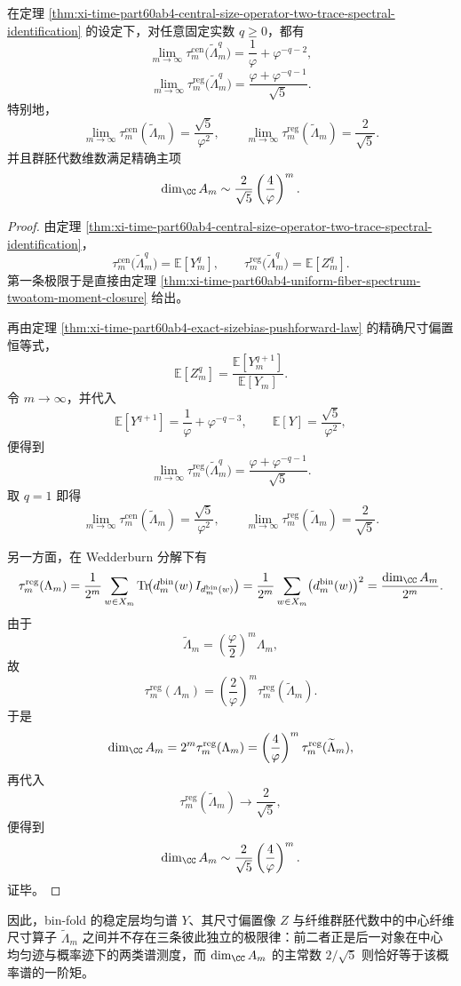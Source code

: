 \begin{theorem}[中心纤维尺寸算子的全阶矩与群胚代数维数主常数]\label{thm:xi-time-part60ab4-central-size-schatten-moment-dimension-constant}
在定理 \ref{thm:xi-time-part60ab4-central-size-operator-two-trace-spectral-identification} 的设定下，对任意固定实数 \(q\ge 0\)，都有
\[
\lim_{m\to\infty}
\tau_m^{\mathrm{cen}}\!\bigl(\widetilde\Lambda_m^q\bigr)
=
\frac{1}{\varphi}+\varphi^{-q-2},
\]
\[
\lim_{m\to\infty}
\tau_m^{\mathrm{reg}}\!\bigl(\widetilde\Lambda_m^q\bigr)
=
\frac{\varphi+\varphi^{-q-1}}{\sqrt5}.
\]
特别地，
\[
\lim_{m\to\infty}\tau_m^{\mathrm{cen}}(\widetilde\Lambda_m)
=
\frac{\sqrt5}{\varphi^2},
\qquad
\lim_{m\to\infty}\tau_m^{\mathrm{reg}}(\widetilde\Lambda_m)
=
\frac{2}{\sqrt5}.
\]
并且群胚代数维数满足精确主项
\[
\dim_{\CC}A_m
\sim
\frac{2}{\sqrt5}
\left(\frac{4}{\varphi}\right)^m.
\]
\end{theorem}
\begin{proof}
由定理 \ref{thm:xi-time-part60ab4-central-size-operator-two-trace-spectral-identification}，
\[
\tau_m^{\mathrm{cen}}\!\bigl(\widetilde\Lambda_m^q\bigr)
=
\mathbb E[Y_m^q],
\qquad
\tau_m^{\mathrm{reg}}\!\bigl(\widetilde\Lambda_m^q\bigr)
=
\mathbb E[Z_m^q].
\]
第一条极限于是直接由定理 \ref{thm:xi-time-part60ab4-uniform-fiber-spectrum-twoatom-moment-closure} 给出。

再由定理 \ref{thm:xi-time-part60ab4-exact-sizebias-pushforward-law} 的精确尺寸偏置恒等式，
\[
\mathbb E[Z_m^q]
=
\frac{\mathbb E[Y_m^{q+1}]}{\mathbb E[Y_m]}.
\]
令 \(m\to\infty\)，并代入
\[
\mathbb E[Y^{q+1}]
=
\frac{1}{\varphi}+\varphi^{-q-3},
\qquad
\mathbb E[Y]
=
\frac{\sqrt5}{\varphi^2},
\]
便得到
\[
\lim_{m\to\infty}\tau_m^{\mathrm{reg}}\!\bigl(\widetilde\Lambda_m^q\bigr)
=
\frac{\varphi+\varphi^{-q-1}}{\sqrt5}.
\]
取 \(q=1\) 即得
\[
\lim_{m\to\infty}\tau_m^{\mathrm{cen}}(\widetilde\Lambda_m)
=
\frac{\sqrt5}{\varphi^2},
\qquad
\lim_{m\to\infty}\tau_m^{\mathrm{reg}}(\widetilde\Lambda_m)
=
\frac{2}{\sqrt5}.
\]

另一方面，在 Wedderburn 分解下有
\[
\tau_m^{\mathrm{reg}}(\Lambda_m)
=
\frac{1}{2^m}
\sum_{w\in X_m}
\operatorname{Tr}\!\bigl(
d_m^{\mathrm{bin}}(w)\,I_{d_m^{\mathrm{bin}}(w)}
\bigr)
=
\frac{1}{2^m}
\sum_{w\in X_m}\bigl(d_m^{\mathrm{bin}}(w)\bigr)^2
=
\frac{\dim_{\CC}A_m}{2^m}.
\]
由于
\[
\widetilde\Lambda_m
=
\left(\frac{\varphi}{2}\right)^m\Lambda_m,
\]
故
\[
\tau_m^{\mathrm{reg}}(\Lambda_m)
=
\left(\frac{2}{\varphi}\right)^m
\tau_m^{\mathrm{reg}}(\widetilde\Lambda_m).
\]
于是
\[
\dim_{\CC}A_m
=
2^m\tau_m^{\mathrm{reg}}(\Lambda_m)
=
\left(\frac{4}{\varphi}\right)^m
\tau_m^{\mathrm{reg}}(\widetilde\Lambda_m),
\]
再代入
\[
\tau_m^{\mathrm{reg}}(\widetilde\Lambda_m)\longrightarrow \frac{2}{\sqrt5},
\]
便得到
\[
\dim_{\CC}A_m
\sim
\frac{2}{\sqrt5}
\left(\frac{4}{\varphi}\right)^m.
\]
证毕。
\end{proof}

因此，bin-fold 的稳定层均匀谱 \(Y\)、其尺寸偏置像 \(Z\) 与纤维群胚代数中的中心纤维尺寸算子 \(\widetilde\Lambda_m\) 之间并不存在三条彼此独立的极限律：前二者正是后一对象在中心均匀迹与概率迹下的两类谱测度，而 \(\dim_{\CC}A_m\) 的主常数 \(2/\sqrt5\) 则恰好等于该概率谱的一阶矩。
